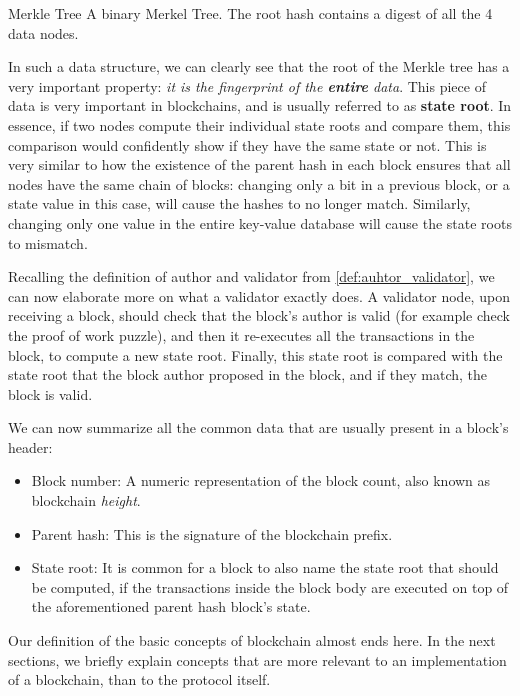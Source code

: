 	{Merkle Tree}
	{A binary Merkel Tree. The root hash contains a digest of all the 4 data nodes.}

In such a data structure, we can clearly see that the root of the Merkle tree has a very important
property: \textit{it is the fingerprint of the \textbf{entire} data}. This piece of data is very
important in blockchains, and is usually referred to as \textbf{state root}. In essence, if two
nodes compute their individual state roots and compare them, this comparison would confidently show
if they have the same state or not. This is very similar to how the existence of the parent hash in
each block ensures that all nodes have the same chain of blocks: changing only a bit in a previous
block, or a state value in this case, will cause the hashes to no longer match. Similarly, changing
only one value in the entire key-value database will cause the state roots to mismatch.

Recalling the definition of author and validator from \ref{def:auhtor_validator}, we can now
elaborate more on what a validator exactly does. A validator node, upon receiving a block, should
check that the block's author is valid (for example check the proof of work puzzle), and then it
re-executes all the transactions in the block, to compute a new state root. Finally, this state root
is compared with the state root that the block author proposed in the block, and if they match, the
block is valid.

We can now summarize all the common data that are usually present in a block's header:

\begin{itemize}
	\item Block number: A numeric representation of the block count, also known as blockchain
	\textit{height}.
	\item Parent hash: This is the signature of the blockchain prefix.
	\item State root: It is common for a block to also name the state root that should be computed,
	if the transactions inside the block body are executed on top of the aforementioned parent hash
	block's state.
\end{itemize}

Our definition of the basic concepts of blockchain almost ends here. In the next sections, we
briefly explain concepts that are more relevant to an implementation of a blockchain, than to the
protocol itself.

